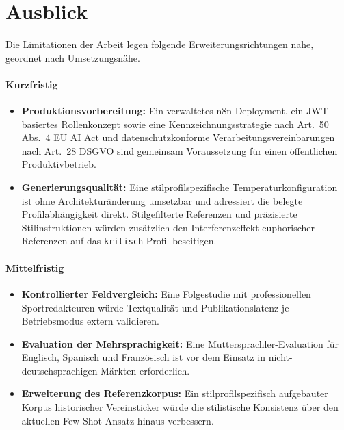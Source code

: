 \section{Ausblick}\label{ausblick}

Die Limitationen der Arbeit legen folgende Erweiterungsrichtungen nahe, geordnet nach Umsetzungsnähe.

\paragraph{Kurzfristig}
\begin{itemize}\tightlist
\item \textbf{Produktionsvorbereitung:} Ein verwaltetes n8n-Deployment, ein JWT-basiertes Rollenkonzept sowie eine Kennzeichnungsstrategie nach Art.~50 Abs.~4 EU AI Act und datenschutzkonforme Verarbeitungsvereinbarungen nach Art.~28 DSGVO sind gemeinsam Voraussetzung für einen öffentlichen Produktivbetrieb.
\item \textbf{Generierungsqualität:} Eine stilprofilspezifische Temperaturkonfiguration ist ohne Architekturänderung umsetzbar und adressiert die belegte Profilabhängigkeit direkt. Stilgefilterte Referenzen und präzisierte Stilinstruktionen würden zusätzlich den Interferenzeffekt euphorischer Referenzen auf das \texttt{kritisch}-Profil beseitigen.
\end{itemize}

\paragraph{Mittelfristig}
\begin{itemize}\tightlist
\item \textbf{Kontrollierter Feldvergleich:} Eine Folgestudie mit professionellen Sportredakteuren würde Textqualität und Publikationslatenz je Betriebsmodus extern validieren.
\item \textbf{Evaluation der Mehrsprachigkeit:} Eine Muttersprachler-Evaluation für Englisch, Spanisch und Französisch ist vor dem Einsatz in nicht-deutschsprachigen Märkten erforderlich.
\item \textbf{Erweiterung des Referenzkorpus:} Ein stilprofilspezifisch aufgebauter Korpus historischer Vereinsticker würde die stilistische Konsistenz über den aktuellen Few-Shot-Ansatz hinaus verbessern.
\end{itemize}

